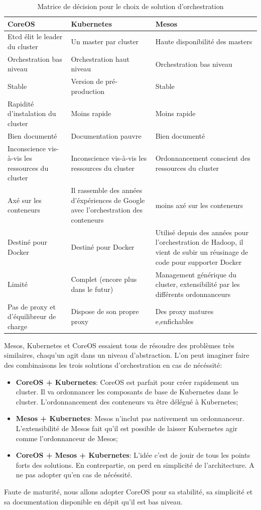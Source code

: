 {
\begin{center}
\begin{table}[H]

	\caption{Matrice de décision pour le choix de solution d'orchestration \label{tab:table_label}}
	\begin{tabu}{| X[c] | X[c] | X[c] |} 


	\hline
	\textbf{CoreOS} & \textbf{Kubernetes} & \textbf{Mesos}\\ [0.95ex] 
	\hline\hline
	Etcd élit le leader du cluster 	& Un master par cluster & Haute disponibilité des masters \\ 
	Orchestration bas niveau & Orchestration haut niveau & Orchestration bas niveau \\ 
	Stable					& Version de pré-production & Stable \\ 
	Rapidité d'instalation du cluster & Moins rapide & Moins rapide \\ 
	Bien documenté & Documentation pauvre & Bien documenté \\ 
	Inconscience vis-à-vis les ressources du cluster & Inconscience vis-à-vis les ressources du cluster & Ordonnancement conscient des ressources du cluster \\ 
	Axé sur les conteneurs & Il rassemble des années d'éxpériences de Google avec l'orchestration des conteneurs	& moins axé sur les conteneurs \\ 
	Destiné pour Docker & Destiné pour Docker	& Utilisé depuis des années pour l'orchestration de Hadoop, il vient de subir un réusinage de code pour supporter Docker \\ 
	Limité & Complet (encore plus dans le futur) & Management générique du cluster, extensibilité par les différents ordonnanceurs \\ 
	Pas de proxy et d'équilibreur de charge & Dispose de son propre proxy & Des proxy matures e,enfichables \\ 
	\hline
	\end{tabu}
\end{table}
\end{center}
}


Mesos, Kubernetes et CoreOS essaient tous de résoudre des problèmes très similaires, chaqu'un agit dans un niveau d'abstraction. L'on peut imaginer faire des combinaisons les trois solutions d'orchestration en cas de nécéssité:

\begin{itemize}
	\item \textbf{CoreOS + Kubernetes}: CoreOS est parfait pour créer rapidement un cluster. Il va ordonnancer les composants de base de Kubernetes dans le cluster. L'ordonnancement des conteneurs va être délégué à Kubernetes;
	\item \textbf{Mesos + Kubernetes}: Mesos n'inclut pas nativement un ordonnanceur. L'extensibilité de Mesos fait qu'il est possible de laisser Kubernetes agir comme l'ordonnanceur de Mesos;
	\item \textbf{CoreOS + Mesos + Kubernetes}: L'idée c'est de jouir de tous les points forts des solutions. En contrepartie, on perd en simplicité de l'architecture. A ne pas adopter qu'en cas de nécéssité.
\end{itemize}

Faute de maturité, nous allons adopter CoreOS pour sa stabilité, sa simplicité et sa documentation disponible en dépit qu'il est bas niveau.